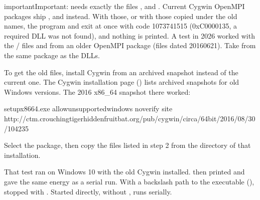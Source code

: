 \documentclass[letterpaper,10pt,english,openany,oneside]{sphinxmanual}
\begin{document}
\begin{sphinxadmonition}{important}{Important:}
\sphinxAtStartPar
{} needs exactly the files ,  and . Current
Cygwin OpenMPI packages ship ,  and  instead. With those,
or with those copied under the old names, the program and  exit at once with code \sphinxhyphen{}1073741515
(0xC0000135, a required DLL was not found), and nothing is printed. A test in 2026 worked with the / files
and  from an older OpenMPI package (files dated 2016\sphinxhyphen{}06\sphinxhyphen{}21). Take  from the same package
as the DLLs.
\end{sphinxadmonition}



\sphinxAtStartPar
To get the old files, install Cygwin from an archived snapshot instead of the current one. The Cygwin installation
page () lists archived snapshots for old Windows versions. The 2016 x86\_64 snapshot
there worked:

\begin{sphinxVerbatim}[commandchars=\\\{\}]
setup\PYGZhy{}x86\PYGZus{}64.exe \PYGZhy{}\PYGZhy{}allow\PYGZhy{}unsupported\PYGZhy{}windows \PYGZhy{}\PYGZhy{}no\PYGZhy{}verify \PYGZhy{}\PYGZhy{}site http://ctm.crouchingtigerhiddenfruitbat.org/pub/cygwin/circa/64bit/2016/08/30/104235
\end{sphinxVerbatim}

\sphinxAtStartPar
Select the  package, then copy the files listed in step 2 from the  directory of that installation.



\sphinxAtStartPar
That test ran on Windows 10 with the old Cygwin installed.  then printed
 and gave the same energy as a serial run. With a backslash path to the executable
(),  stopped with . Started directly, without
,  runs serially.
\end{document}
